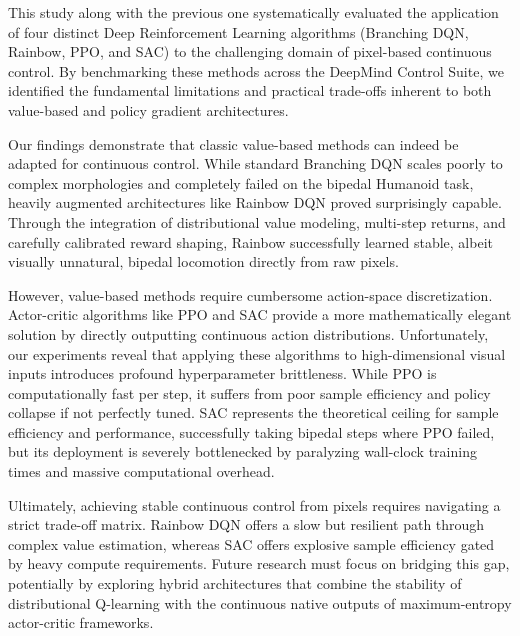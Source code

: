 This study along with the previous one systematically evaluated the application of four distinct Deep Reinforcement Learning algorithms (Branching DQN, Rainbow, PPO, and SAC) to the challenging domain of pixel-based continuous control. By benchmarking these methods across the DeepMind Control Suite, we identified the fundamental limitations and practical trade-offs inherent to both value-based and policy gradient architectures.

Our findings demonstrate that classic value-based methods can indeed be adapted for continuous control. While standard Branching DQN scales poorly to complex morphologies and completely failed on the bipedal Humanoid task, heavily augmented architectures like Rainbow DQN proved surprisingly capable. Through the integration of distributional value modeling, multi-step returns, and carefully calibrated reward shaping, Rainbow successfully learned stable, albeit visually unnatural, bipedal locomotion directly from raw pixels. 

However, value-based methods require cumbersome action-space discretization. Actor-critic algorithms like PPO and SAC provide a more mathematically elegant solution by directly outputting continuous action distributions. Unfortunately, our experiments reveal that applying these algorithms to high-dimensional visual inputs introduces profound hyperparameter brittleness. While PPO is computationally fast per step, it suffers from poor sample efficiency and policy collapse if not perfectly tuned. SAC represents the theoretical ceiling for sample efficiency and performance, successfully taking bipedal steps where PPO failed, but its deployment is severely bottlenecked by paralyzing wall-clock training times and massive computational overhead.

Ultimately, achieving stable continuous control from pixels requires navigating a strict trade-off matrix. Rainbow DQN offers a slow but resilient path through complex value estimation, whereas SAC offers explosive sample efficiency gated by heavy compute requirements. Future research must focus on bridging this gap, potentially by exploring hybrid architectures that combine the stability of distributional Q-learning with the continuous native outputs of maximum-entropy actor-critic frameworks.
